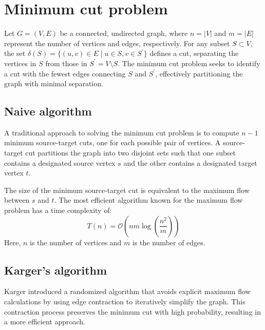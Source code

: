 \section{Minimum cut problem}

Let $G = (V, E)$ be a connected, undirected graph, where $n = \left\lvert V\right\rvert $ and $m = \left\lvert E\right\rvert $ represent the number of vertices and edges, respectively. 
For any subset $S \subset V$, the set $\delta(S) = \{(u, v) \in E \mid u \in S, v \in S^\prime\}$ defines a cut, separating the vertices in $S$ from those in $S^\prime=V\setminus S$. 
The minimum cut problem seeks to identify a cut with the fewest edges connecting $S$ and $S^\prime$, effectively partitioning the graph with minimal separation.

\subsection{Naive algorithm}
A traditional approach to solving the minimum cut problem is to compute $n-1$ minimum source-target cuts, one for each possible pair of vertices.
A source-target cut partitions the graph into two disjoint sets such that one subset contains a designated source vertex $s$ and the other contains a designated target vertex $t$.

The size of the minimum source-target cut is equivalent to the maximum flow between $s$ and $t$. 
The most efficient algorithm known for the maximum flow problem has a time complexity of:
\[T(n)=\mathcal{O}\left(nm \log\left(\frac{n^2}{m}\right)\right)\]
Here, $n$ is the number of vertices and $m$ is the number of edges. 

\subsection{Karger's algorithm}
Karger introduced a randomized algorithm that avoids explicit maximum flow calculations by using edge contraction to iteratively simplify the graph.
This contraction process preserves the minimum cut with high probability, resulting in a more efficient approach.

